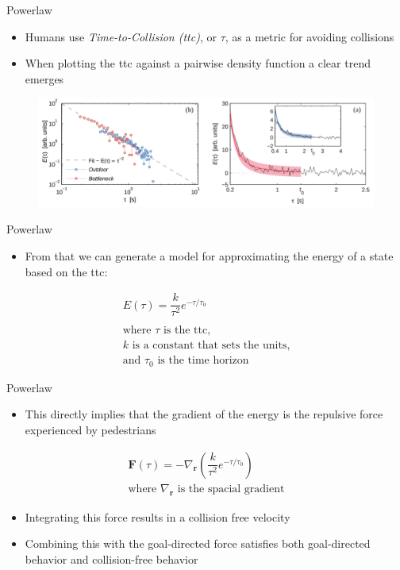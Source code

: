 \documentclass[aspectratio=169,xcolor=dvipsnames]{beamer}
\begin{document}
\begin{frame}{Powerlaw}
  \begin{itemize}
    \item Humans use \textit{Time-to-Collision (ttc)}, or $\tau$, as a metric for avoiding collisions
    \item When plotting the ttc against a pairwise density function a clear trend emerges
  \end{itemize}
  \begin{figure}
    \includegraphics[width=1.0\textwidth]{imgs/pl_graph.png}
  \end{figure}
\end{frame}

\begin{frame}{Powerlaw}
  \begin{itemize}
    \item From that we can generate a model for approximating the energy of a state based on the ttc:
  \end{itemize}
  \begin{gather*}
    E(\tau) = \dfrac{k}{\tau^{2}} e^{-\tau / \tau_{0}}\\\\
    \text{where $\tau$ is the ttc,}\\
    \text{$k$ is a constant that sets the units,}\\
    \text{and $\tau_{0}$ is the time horizon}
  \end{gather*}
\end{frame}

\begin{frame}{Powerlaw}
  \begin{itemize}
    \item This directly implies that the gradient of the energy is the repulsive force experienced by pedestrians
  \end{itemize}
  \begin{gather*}
    \mathbf{F}(\tau) = - \nabla_{\mathbf{r}}\left( \dfrac{k}{\tau^{2}} e^{-\tau / \tau_{0}} \right)\\
    \text{where $\nabla_{\mathbf{r}}$ is the spacial gradient}
  \end{gather*}
  \begin{itemize}
    \item Integrating this force results in a collision free velocity
    \item Combining this with the goal-directed force satisfies both goal-directed behavior and collision-free behavior
  \end{itemize}
\end{frame}
\end{document}

